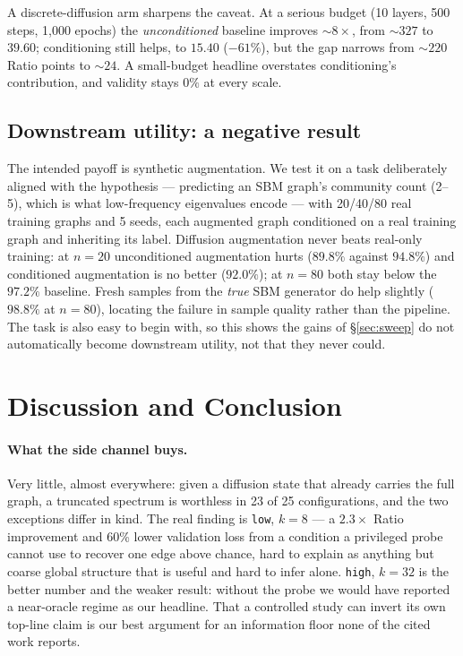 \documentclass[11pt]{article}
\begin{document}
A discrete-diffusion arm \citep{austin2021d3pm} sharpens the caveat. At a serious budget (10
layers, 500 steps, 1{,}000 epochs) the \emph{unconditioned} baseline improves ${\sim}8\times$, from ${\sim}327$ to
$39.60$; conditioning still helps, to $15.40$ ($-61\%$), but the gap narrows from ${\sim}220$
Ratio points to ${\sim}24$. A small-budget headline overstates conditioning's contribution, and validity stays $0\%$ at
every scale.

\subsection{Downstream utility: a negative result}
\label{sec:downstream}
The intended payoff is synthetic augmentation. We test it on a task
deliberately aligned with the hypothesis --- predicting an SBM graph's community count (2--5),
which is what low-frequency eigenvalues encode --- with 20/40/80 real training graphs and 5 seeds,
each augmented graph conditioned on a real training graph and inheriting its label. Diffusion augmentation never beats real-only training: at $n{=}20$
unconditioned augmentation hurts ($89.8\%$ against $94.8\%$) and conditioned
augmentation is no better ($92.0\%$); at $n{=}80$ both stay below the $97.2\%$ baseline. Fresh
samples from the \emph{true} SBM generator do help slightly ($98.8\%$ at $n{=}80$), locating the
failure in sample quality rather than the pipeline. The task is also easy to begin with, so this shows the gains of \S\ref{sec:sweep}
do not automatically become downstream utility, not that they never could.

\section{Discussion and Conclusion}
\label{sec:discussion}

\paragraph{What the side channel buys.} Very little, almost everywhere: given a diffusion state that already carries the full graph, a
truncated spectrum is worthless in 23 of 25 configurations, and the two exceptions differ in kind. The real finding is \texttt{low}, $k{=}8$ --- a $2.3\times$ Ratio improvement and 60\% lower
validation loss from a condition a privileged probe cannot use to recover one edge above chance,
hard to explain as anything but coarse global structure that is useful and hard to infer alone.
\texttt{high}, $k{=}32$ is the better number and the weaker result: without the probe we would
have reported a near-oracle regime as our headline. That a controlled study can invert its own
top-line claim is our best argument for an information floor none of the cited work reports.
\end{document}
